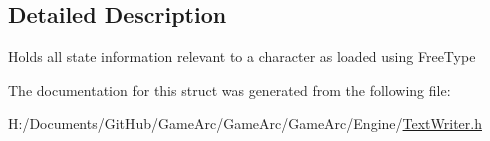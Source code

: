 \subsection{Detailed Description}
Holds all state information relevant to a character as loaded using Free\+Type 

The documentation for this struct was generated from the following file\+:\begin{DoxyCompactItemize}
\item 
H\+:/\+Documents/\+Git\+Hub/\+Game\+Arc/\+Game\+Arc/\+Game\+Arc/\+Engine/\hyperlink{_text_writer_8h}{Text\+Writer.\+h}\end{DoxyCompactItemize}
